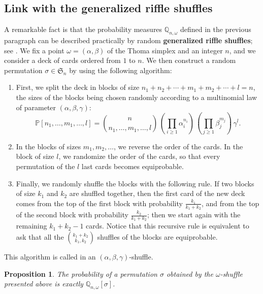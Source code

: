 \documentclass[smallextended,nospthms]{svjour3}
\newtheorem{proposition}[theorem]{Proposition}
\theoremstyle{remark}
\newcommand{\sym}{\mathfrak{S}}
\newcommand{\proba}{\mathbb{P}}
\newcommand{\qproba}{\mathbb{Q}}
\begin{document}
\subsection{Link with the generalized riffle shuffles}\label{riffleshuffle}
A remarkable fact is that the probability measures $\qproba_{n,\omega}$ defined in the previous paragraph can be described practically by random \textbf{generalized riffle shuffles}; see \cite{Ful02}. We fix a point $\omega=(\alpha,\beta)$ of the Thoma simplex and an integer $n$, and we consider a deck of cards ordered from $1$ to $n$. We then construct a random permutation $\sigma \in \sym_{n}$ by using the following algorithm:\vspace{2mm}
\begin{enumerate}
\item First, we split the deck in blocks of size $n_{1}+n_{2}+\cdots+m_{1}+m_{2}+\cdots+l=n$, the sizes of the blocks being chosen randomly according to a multinomial law of parameter $(\alpha,\beta,\gamma)$:
$$\proba[n_{1},\ldots,m_{1},\ldots,l]=\binom{n}{n_{1},\ldots,m_{1},\ldots,l}\,\left(\prod_{i\geq 1}\alpha_{i}^{n_{i}}\right)\,\left(\prod_{j\geq 1}\beta_{j}^{m_{j}}\right)\,\gamma^{l}.$$\vspace{2mm}
\item In the blocks of sizes $m_{1},m_{2},\ldots$, we reverse the order of the cards. In the block of size $l$, we randomize the order of the cards, so that every permutation of the $l$ last cards becomes equiprobable.\vspace{2mm}
\item Finally, we randomly shuffle the blocks with the following rule. If two blocks of size $k_{1}$ and $k_{2}$ are shuffled together, then the first card of the new deck comes from the top of the first block with probability $\frac{k_{1}}{k_{1}+k_{2}}$, and from the top of the second block with probability $\frac{k_{2}}{k_{1}+k_{2}}$; then we start again with the remaining $k_{1}+k_{2}-1$ cards. Notice that this recursive rule is equivalent to ask that all the $\binom{k_{1}+k_{2}}{k_{1},k_{2}}$ shuffles of the blocks are equiprobable.
\end{enumerate}
This algorithm is called in \cite{Ful02} an $(\alpha,\beta,\gamma)$-shuffle.
\begin{proposition}\label{apocalyptica}
The probability of a permutation $\sigma$ obtained by the $\omega$-shuffle presented above is exactly $\qproba_{n,\omega}[\sigma]$.
\end{proposition}
\end{document}
